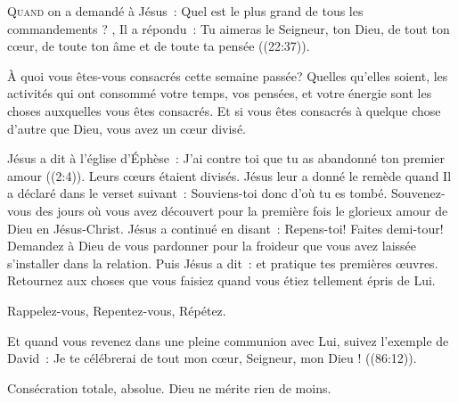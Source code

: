 

\lettrine{Q}{uand} on a demandé à Jésus~:
 \Og Quel est le plus grand de tous les commandements ? \Fg{},
 Il a répondu~: 
 \Og Tu aimeras le Seigneur, ton Dieu, de tout ton c\oe{}ur,
 de toute ton âme et de toute ta pensée \Fg{} ((22:37)). 

\`A quoi vous êtes-vous consacrés cette semaine passée?
 Quelles qu'elles soient, les activités qui ont consommé votre temps,
 vos pensées, et votre énergie sont les choses auxquelles
 vous êtes consacrés. Et si vous êtes consacrés à quelque chose
 d'autre que Dieu, vous avez un c\oe{}ur divisé. 


Jésus a dit à l'église d'Éphèse~:
 \Og J'ai contre toi que tu as abandonné ton premier amour \Fg{}
 ((2:4)).
 Leurs c\oe{}urs étaient divisés. Jésus leur a donné le remède quand
 Il a déclaré dans le verset suivant~:
 \Og Souviens-toi donc d'où tu es tombé. \Fg{}
 Souvenez-vous des jours où vous avez découvert pour la première fois
 le glorieux amour de Dieu en Jésus-Christ.
 Jésus a continué en disant~: \Og Repens-toi! \Fg{} Faites demi-tour!
 Demandez à Dieu de vous pardonner pour la froideur que vous avez laissée
 s'installer dans la relation. Puis Jésus a dit~:
 \Og et pratique tes premières \oe{}uvres. \Fg{}
 Retournez aux choses que vous faisiez quand vous étiez tellement épris de Lui. 

Rappelez-vous, Repentez-vous, Répétez. 

Et quand vous revenez dans une pleine communion avec Lui,
 suivez l'exemple de David~:
 \Og Je te célébrerai de tout mon c\oe{}ur, Seigneur, mon Dieu ! \Fg{}
 ((86:12)).

Consécration totale, absolue. Dieu ne mérite rien de moins. 

\dvrule




